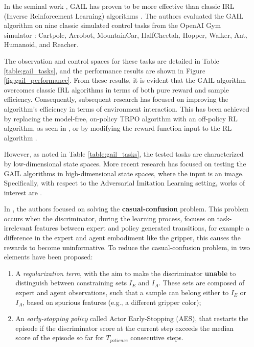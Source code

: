 In the seminal work \cite{ho2016gail}, GAIL has proven to be more effective than classic IRL (Inverse Reinforcement Learning) algorithms \cite{ziebart2008maximum_entropy,ho2016model}. The authors evaluated the GAIL algorithm on nine classic simulated control tasks from the OpenAI Gym simulator \cite{brockman2016openai}: Cartpole, Acrobot, MountainCar, HalfCheetah, Hopper, Walker, Ant, Humanoid, and Reacher.


 

The observation and control spaces for these tasks are detailed in Table \ref{table:gail_tasks}, and the performance results are shown in Figure \ref{fig:gail_performance}. From these results, it is evident that the GAIL algorithm overcomes classic IRL algorithms in terms of both pure reward and sample efficiency. Consequently, subsequent research has focused on improving the algorithm's efficiency in terms of environment interaction. This has been achieved by replacing the model-free, on-policy TRPO algorithm with an off-policy RL algorithm, as seen in \cite{kostrikov2018discriminator}, or by modifying the reward function input to the RL algorithm \cite{fu2018airl,ghasemipour2020divergence_minimization_perspective}.

However, as noted in Table \ref{table:gail_tasks}, the tested tasks are characterized by low-dimensional state spaces. More recent research \cite{liu2018imitation_from_observation,reddy2019sqil,zolna2021task_relevant_ail,rafailov2021visual_ail} has focused on testing the GAIL algorithms in high-dimensional state spaces, where the input is an image. Specifically, with respect to the Adversarial Imitation Learning setting, works of interest are \cite{zolna2021task_relevant_ail,rafailov2021visual_ail}. 

In \cite{zolna2021task_relevant_ail}, the authors focused on solving the \textbf{casual-confusion} problem. This problem occurs when the discriminator, during the learning process, focuses on task-irrelevant features between expert and policy generated transitions, for example a difference in the expert and agent embodiment like the gripper, this causes the rewards to become uninformative. To reduce the casual-confusion problem, in \cite{zolna2021task_relevant_ail} two elements have been proposed: 
\begin{enumerate}[label=\arabic*.]
    \item A \textit{regularization term}, with the aim to make the discriminator \textbf{unable} to distinguish between constraining sets $I_{E}$ and $I_{A}$. These sets are composed of expert and agent observations, such that a sample can belong either to $I_{E}$ or $I_{A}$, based on spurious features (e.g., a different gripper color);
    \item An \textit{early-stopping policy} called Actor Early-Stopping (AES), that restarts the episode if the discriminator score at the current step exceeds the median score of the episode so far for $T_{patience}$ consecutive steps.
\end{enumerate} 

